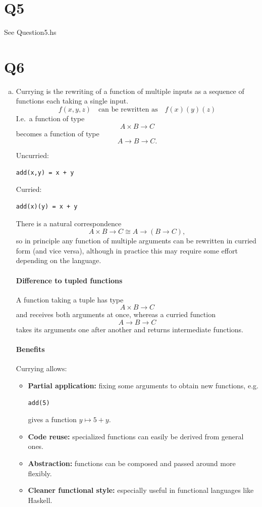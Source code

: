 \documentclass{article}
\begin{document}
\section*{Q5}
See Question5.hs
\section*{Q6}
\begin{enumerate}[(a)]
\item
Currying is the rewriting of a function of multiple inputs as a sequence of functions each taking a single input.
\[
f(x,y,z) \quad \text{can be rewritten as} \quad f(x)(y)(z)
\]
I.e.\ a function of type 
\[
A \times B \to C
\]
becomes a function of type
\[
A \to B \to C.
\]

Uncurried:
\begin{verbatim}
add(x,y) = x + y
\end{verbatim}
Curried:
\begin{verbatim}
add(x)(y) = x + y
\end{verbatim}

There is a natural correspondence
\[
A \times B \to C \cong A \to (B \to C),
\]
so in principle any function of multiple arguments can be rewritten in curried form (and vice versa), although in practice this may require some effort depending on the language.

\paragraph{Difference to tupled functions}
A function taking a tuple has type
\[
A \times B \to C
\]
and receives both arguments at once, whereas a curried function
\[
A \to B \to C
\]
takes its arguments one after another and returns intermediate functions.

\paragraph{Benefits}
Currying allows:
\begin{itemize}
\item \textbf{Partial application:} fixing some arguments to obtain new functions, e.g.
\begin{verbatim}
add(5)
\end{verbatim}
gives a function $y \mapsto 5 + y$.
\item \textbf{Code reuse:} specialized functions can easily be derived from general ones.
\item \textbf{Abstraction:} functions can be composed and passed around more flexibly.
\item \textbf{Cleaner functional style:} especially useful in functional languages like Haskell.
\end{itemize}


\end{enumerate}
\end{document}
